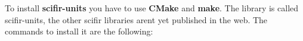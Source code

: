 To install {\bfseries{scifir-\/units}} you have to use {\bfseries{CMake}} and {\bfseries{make}}. The library is called scifir-\/units, the other scifir libraries aren\textquotesingle{}t yet published in the web. The commands to install it are the following\+:


\begin{DoxyCode}{0}

\end{DoxyCode}
 